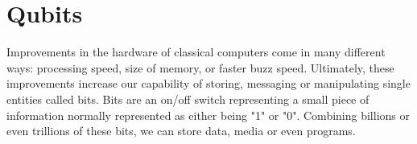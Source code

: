 
\section{Qubits}
Improvements in the hardware of classical computers come in many different ways: processing speed, size of memory, or faster buzz speed. Ultimately, these improvements increase our capability of storing, messaging or manipulating single entities called bits. Bits are an on/off switch representing a small piece of information normally represented as either being "1" or "0". Combining billions or even trillions of these bits, we can store data, media or even programs.

